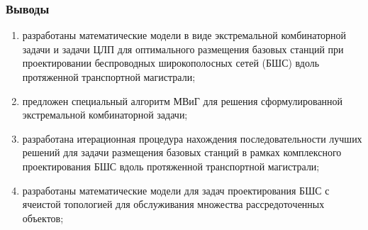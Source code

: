 \begin{frame}
    \frametitle{Выводы}
    
    \begin{enumerate}
        \item разработаны математические модели в виде экстремальной комбинаторной задачи и
        задачи ЦЛП для оптимального размещения базовых станций при
        проектировании беспроводных широкополосных сетей (БШС) вдоль протяженной транспортной магистрали;
        \item предложен специальный алгоритм МВиГ для решения сформулированной
        экстремальной комбинаторной задачи;
        \item разработана итерационная процедура нахождения последовательности лучших
        решений для задачи размещения базовых станций в рамках комплексного
        проектирования БШС вдоль протяженной транспортной магистрали;
        \item разработаны математические модели для задач проектирования БШС с ячеистой
        топологией для обслуживания множества рассредото­ченных объектов;
    \end{enumerate}
\end{frame}


